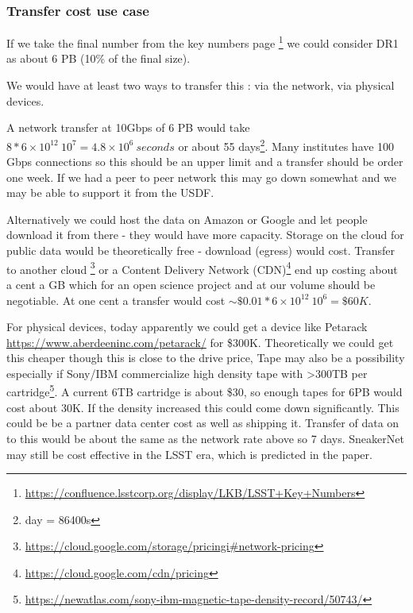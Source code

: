 \subsubsection{Transfer cost use case \label{sec:xfercost}}
If we take the final number from the key numbers page \footnote{\url{https://confluence.lsstcorp.org/display/LKB/LSST+Key+Numbers}} we could consider \gls{DR1} as about 6 \gls{PB} (10\% of the final size).

We would have at least  two ways to transfer this : via the network, via physical devices.

A network transfer at 10Gbps of 6 \gls{PB} would take $8 * 6 \times 10^{12} \ 10^7 = 4.8 \times 10^{6}~seconds $ or about 55 days\footnote{ day = 86400s}.
Many institutes have 100 Gbps connections so this should be an upper limit and a transfer should be order one week. If we had a peer to peer network this may go down somewhat and we may be able to support it from the \gls{USDF}.

Alternatively we could host the data on Amazon or Google and let people download it from there - they would have more capacity.
Storage on the cloud  for public data would be theoretically free - download (egress)  would  cost.
Transfer to another cloud \footnote{\url{https://cloud.google.com/storage/pricingi\#network-pricing}}  or
 a Content Delivery Network (\gls{CDN})\footnote{\url{https://cloud.google.com/cdn/pricing}}
 end up costing  about a cent a \gls{GB} which for an open science project and at our volume  should  be negotiable.  At one cent a transfer would cost
  $\sim \$0.01 * 6 \times 10^{12} \ 10^6 = \$60K$.

For physical devices, today apparently we could get a device like Petarack \url{https://www.aberdeeninc.com/petarack/} for \$300K.
Theoretically we could get this cheaper though this is close to the drive price,
Tape may also be a possibility especially if Sony/IBM commercialize high density tape with >300TB per cartridge\footnote{\url{https://newatlas.com/sony-ibm-magnetic-tape-density-record/50743/}}. A current 6TB cartridge is about \$30, so enough tapes for 6PB would cost about  30K. If the density increased this could come down significantly.
This could be be a partner data center cost as well as shipping it. Transfer of data on to this would be about the same as the network rate above so 7 days. SneakerNet \cite{2002cs........8011G} may still be  cost effective in the \gls{LSST} era, which is predicted in the  paper.
